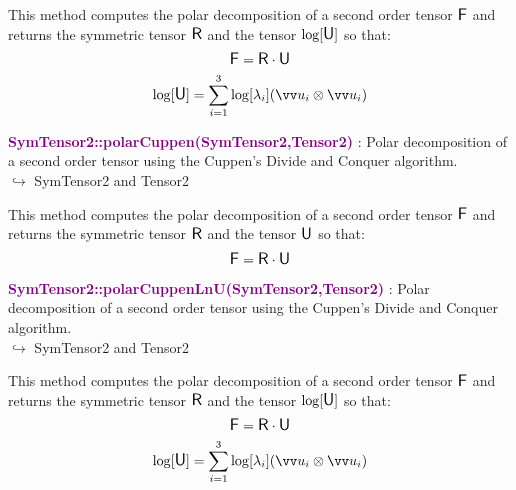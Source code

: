 This method computes the polar decomposition of a second order tensor $\mbox{\large\ensuremath{\mathsf{F}}}$ and returns the symmetric tensor $\mbox{\large\ensuremath{\mathsf{R}}}$ and the tensor $\log[\mbox{\large\ensuremath{\mathsf{U}}}]$ so that:
\begin{equation*}
\mbox{\large\ensuremath{\mathsf{F}}} = \mbox{\large\ensuremath{\mathsf{R}}} \cdot \mbox{\large\ensuremath{\mathsf{U}}}
\end{equation*}
\begin{equation*}
\log [\U] =\sum _{i=1}^{3}\log[\lambda_{i}](\overrightarrow{u}_{i}\otimes \overrightarrow{u}_{i})
\end{equation*}

\textcolor{purple}{\textbf{SymTensor2::polarCuppen(SymTensor2,Tensor2)}}\label{SymTensor2::polarCuppen(SymTensor2,Tensor2)} : Polar decomposition of a second order tensor using the Cuppen’s Divide and Conquer algorithm.\\ \hspace*{5mm}$\hookrightarrow$ SymTensor2 and Tensor2

This method computes the polar decomposition of a second order tensor $\mbox{\large\ensuremath{\mathsf{F}}}$ and returns the symmetric tensor $\mbox{\large\ensuremath{\mathsf{R}}}$ and the tensor $\mbox{\large\ensuremath{\mathsf{U}}}$ so that:
\begin{equation*}
\mbox{\large\ensuremath{\mathsf{F}}} = \mbox{\large\ensuremath{\mathsf{R}}} \cdot \mbox{\large\ensuremath{\mathsf{U}}}
\end{equation*}

\textcolor{purple}{\textbf{SymTensor2::polarCuppenLnU(SymTensor2,Tensor2)}}\label{SymTensor2::polarCuppenLnU(SymTensor2,Tensor2)} : Polar decomposition of a second order tensor using the Cuppen’s Divide and Conquer algorithm.\\ \hspace*{5mm}$\hookrightarrow$ SymTensor2 and Tensor2

This method computes the polar decomposition of a second order tensor $\mbox{\large\ensuremath{\mathsf{F}}}$ and returns the symmetric tensor $\mbox{\large\ensuremath{\mathsf{R}}}$ and the tensor $\log[\mbox{\large\ensuremath{\mathsf{U}}}]$ so that:
\begin{equation*}
\mbox{\large\ensuremath{\mathsf{F}}} = \mbox{\large\ensuremath{\mathsf{R}}} \cdot \mbox{\large\ensuremath{\mathsf{U}}}
\end{equation*}
\begin{equation*}
\log [\U] =\sum _{i=1}^{3}\log[\lambda_{i}](\overrightarrow{u}_{i}\otimes \overrightarrow{u}_{i})
\end{equation*}

